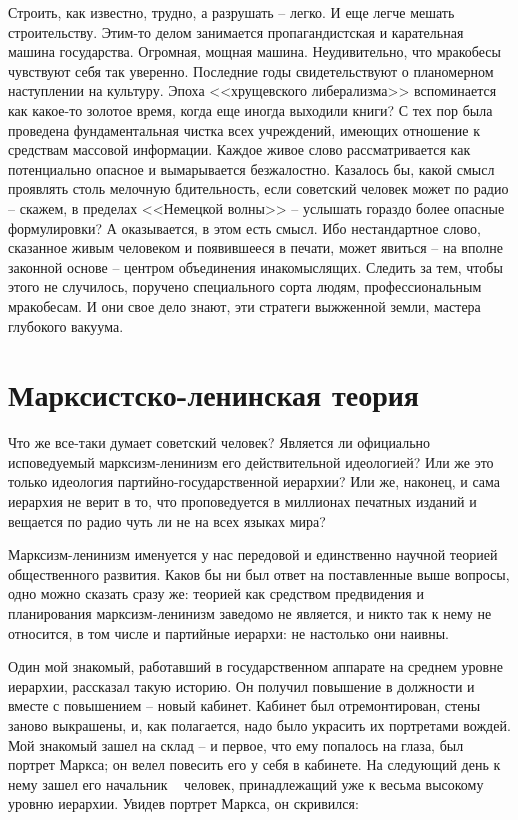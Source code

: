 \documentclass{book}
\begin{document}
Строить, как известно, трудно, а разрушать -- легко. И еще легче мешать строительству. Этим-то делом занимается пропагандистская 
и карательная машина государства. Огромная, мощная машина. Неудивительно, что мракобесы чувствуют себя так уверенно. Последние 
годы свидетельствуют о планомерном наступлении на культуру. Эпоха <<хрущевского либе­рализма>> вспоминается как какое-то золотое 
время, когда еще иногда выходили книги?  С тех пор была проведена фундаментальная чистка всех учреждений, имеющих отношение к 
средствам массовой информации. Каждое живое слово рассматривается как потенциально опасное и вымарывается безжалостно. Казалось 
бы, какой смысл проявлять столь мелочную бдительность, если советский человек может по радио -- скажем, в пределах <<Немецкой 
волны>> -- услышать гораздо более опасные формулировки? А оказывается, в этом есть смысл. Ибо нестандартное слово, сказанное 
живым человеком и появившееся в печати, может явиться -- на вполне законной основе -- центром объединения инакомыслящих. Следить 
за тем, чтобы этого не случилось, поручено специального сорта людям, профессиональным мракобесам. И они свое дело знают, эти 
стратеги выжженной земли, мастера глубокого вакуума.


\section{Марксистско-ленинская теория}


Что же все-таки думает советский человек? Является ли официально исповедуемый марксизм-ленинизм его действи­тельной идеологией? Или же это только идеология партийно-государственной иерархии? Или же, наконец, и сама иерархия не верит в то, что проповедуется в миллионах печатных изда­ний и вещается по радио чуть ли не на всех языках мира?

Марксизм-ленинизм именуется у нас передовой и единствен­но научной теорией  общественного развития. Каков бы ни был ответ на поставленные выше вопросы, одно можно сказать сразу же: теорией как средством предвидения и планирования марксизм-ленинизм заведомо не является, и никто так к нему не относится, в том числе и партийные иерархи: не настолько они наивны.

Один мой знакомый, работавший в государственном аппа­рате на среднем уровне иерархии, рассказал такую историю. Он получил повышение в должности и вместе с повышением -- новый кабинет. Кабинет был отремонтирован, стены заново выкрашены, и, как полагается, надо было украсить их порт­ретами вождей. Мой знакомый зашел на склад -- и первое, что ему попалось на глаза, был портрет Маркса; он велел пове­сить его у себя в кабинете. На следующий день к нему зашел его начальник ~ человек, принадлежащий уже к весьма высо­кому уровню иерархии. Увидев портрет Маркса, он скривился:
\end{document}
